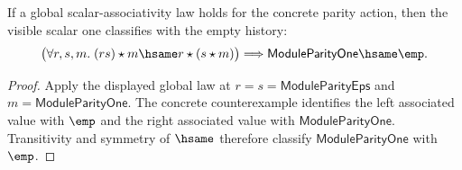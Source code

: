 \begin{theorem}
\label{thm:module-parity-action-scalar-associativity-forces-empty-visible-one}
If a global scalar-associativity law holds for the concrete parity action, then
the visible scalar one classifies with the empty history:
$$
\bigl(\forall r,s,m.\; (rs)\star m\hsame r\star(s\star m)\bigr)
\Longrightarrow
\mathsf{ModuleParityOne}\hsame\emp.
$$
\end{theorem}
\begin{proof}
Apply the displayed global law at $r=s=\mathsf{ModuleParityEps}$ and
$m=\mathsf{ModuleParityOne}$. The concrete counterexample identifies the left
associated value with $\emp$ and the right associated value with
$\mathsf{ModuleParityOne}$. Transitivity and symmetry of $\hsame$ therefore
classify $\mathsf{ModuleParityOne}$ with $\emp$.
\end{proof}

